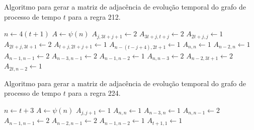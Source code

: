 \documentclass[12pt,a4paper]{article}
\begin{document}
\begin{algorithm}[H]
\caption{Algoritmo para gerar a matriz de adjacência de evolução temporal do
grafo de processo de tempo $t$ para a regra 212.}
\label{alg:r212}
\begin{algorithmic}
\STATE $n \leftarrow 4(t+1)$
\STATE $A \leftarrow \psi(n)$
    \STATE $A_{j,3t+j+1} \leftarrow 2$
    \STATE $A_{3t+j,t+j} \leftarrow 2$
    \STATE $A_{2t+j,j} \leftarrow 1$
    \STATE $A_{2t+j,3t+1} \leftarrow 2$
\ENDFOR
{}
        \STATE $A_{t+j,2t+j+1} \leftarrow 1$
    \ENDFOR
\ENDIF
{}
    \STATE $A_{n-(t-j+4),2t+1} \leftarrow 1$
\ENDFOR
\STATE $A_{n,n} \leftarrow 1$
\STATE $A_{n-2,n} \leftarrow 1$
\STATE $A_{n-1,n-1} \leftarrow 2$
\STATE $A_{n-3,n-1} \leftarrow 2$
\STATE $A_{n-1,n-2} \leftarrow 1$
\STATE $A_{n,n-3} \leftarrow 2$
\STATE $A_{n-2,3t+1} \leftarrow 2$
\STATE $A_{2t,n-2} \leftarrow 1$
\end{algorithmic}
\end{algorithm}

\begin{algorithm}[H]
\caption{Algoritmo para gerar a matriz de adjacência de evolução temporal do
grafo de processo de tempo $t$ para a regra 224.}
\label{alg:r224}
\begin{algorithmic}
\STATE $n \leftarrow t+3$
\STATE $A \leftarrow \psi(n)$
    \STATE $A_{j,j+1} \leftarrow 1$
\ENDFOR
\STATE $A_{n,n} \leftarrow 1$
\STATE $A_{n-3,n} \leftarrow 1$
\STATE $A_{n,n-1} \leftarrow 2$
\STATE $A_{n-1,n-1} \leftarrow 2$
\STATE $A_{n-2,n-1} \leftarrow 2$
\STATE $A_{n-1,n-2} \leftarrow 1$
\STATE $A_{t+1,1} \leftarrow 1$
\end{algorithmic}
\end{algorithm}

\end{document}
